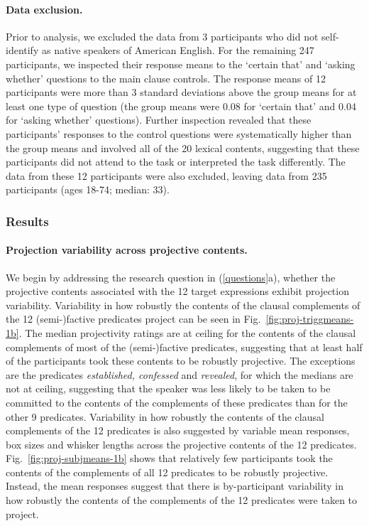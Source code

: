 \documentclass[11pt,fleqn]{article}
\newcommand{\6}{\mbox{$[\hspace*{-.6mm}[$}}
\newcommand{\9}{\mbox{$]\hspace*{-.6mm}]$}}
\newcommand{\figref}[1]{Fig.~\ref{#1}}
\begin{document}
\paragraph{Data exclusion.} Prior to analysis, we excluded the data from 3 participants who did not self-identify as native speakers of American English. For the remaining 247 participants, we inspected their response means to the `certain that' and `asking whether' questions to the main clause controls. The response means of 12 participants were more than 3 standard deviations above the group means for at least one type of question (the group means were 0.08 for `certain that' and 0.04 for `asking whether' questions). Further inspection revealed that these participants' responses to the control questions were systematically higher than the group means and involved all of the 20 lexical contents, suggesting that these participants did not attend to the task or interpreted the task differently. The data from these 12 participants were also excluded, leaving data from 235 participants (ages 18-74; median: 33).

\subsubsection{Results}

\paragraph{Projection variability across projective contents.} We begin by addressing the research question in (\ref{questions}a), whether the projective contents associated with the 12 target expressions exhibit projection variability. Variability in how robustly the contents of the clausal complements of the 12 (semi-)factive predicates project can be seen in \figref{fig:proj-triggmeans-1b}. The median projectivity ratings are at ceiling for the contents of the clausal complements of most of the (semi-)factive predicates, suggesting that at least half of the participants took these contents to be robustly projective. The exceptions are the predicates {\em established, confessed} and {\em revealed}, for which the medians are not at ceiling, suggesting that the speaker was less likely to be taken to be committed to the contents of the complements of these predicates than for the other 9 predicates. Variability in how robustly the contents of the clausal complements of the 12 predicates is also suggested by variable mean responses, box sizes and whisker lengths across the projective contents of the 12 predicates. \figref{fig:proj-subjmeans-1b} shows that relatively few participants took the contents of the complements of all 12 predicates to be robustly projective. Instead, the mean responses suggest that there is by-participant variability in how robustly the contents of the complements of the 12 predicates were taken to project.
\end{document}
